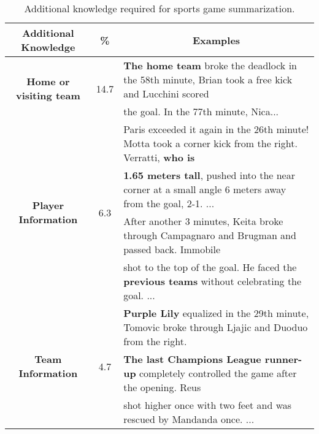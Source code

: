 \begin{table*}[t]
  \centering
  \setlength{\belowcaptionskip}{-10pt}
  \resizebox{0.80\textwidth}{!}
  {
    \begin{tabular}{c|c|l}
      \hline
      \textbf{Additional Knowledge}                     & \%                    & \multicolumn{1}{c}{\textbf{Examples}}                                                                            \\ \hline
      \multirow{2}{*}{\textbf{Home or visiting team}} & \multirow{2}{*}{14.7} & \textbf{The home team} broke the deadlock in the 58th minute, Brian took a free kick and Lucchini scored     \\
                                                   &                       & the goal. In the 77th minute, Nica...                                                                       \\ \hline
      \multirow{4}{*}{\textbf{Player Information}}          & \multirow{4}{*}{6.3}  & Paris exceeded it again in the 26th minute! Motta took a corner kick from the right. Verratti, \textbf{who is}   \\
                                                   &                       & \textbf{1.65 meters tall}, pushed into the near corner at a small angle 6 meters away from the goal, 2-1. ...    \\ \cline{3-3}
                                                   &                       & After another 3 minutes, Keita broke through Campagnaro and Brugman and passed back. Immobile   \\
                                                   &                       & shot to the top of the goal. He faced the \textbf{previous teams} without celebrating the goal. ...                      \\ \hline
      \multirow{3}{*}{\textbf{Team Information}}            & \multirow{3}{*}{4.7}  & \textbf{Purple Lily} equalized in the 29th minute, Tomovic broke through Ljajic and Duoduo from the right.   \\ \cline{3-3} 
                                                   &                       & \textbf{The last Champions League runner-up} completely controlled the game after the opening. Reus   \\
                                                   &                       & shot higher once with two feet and was rescued by Mandanda once. ...                                                \\ \hline
      \end{tabular}
  }
  \setlength{\belowcaptionskip}{3pt}
  \caption{Additional knowledge required for sports game summarization.}
  \label{table:addition_knowledge}
\end{table*}

